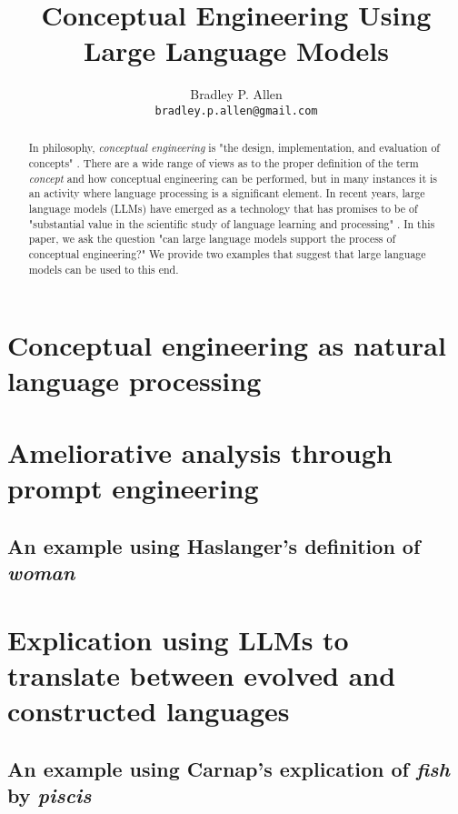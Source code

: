 \documentclass{article}
\title{Conceptual Engineering Using Large Language Models}
\author{Bradley P. Allen\\
\texttt{bradley.p.allen@gmail.com} \\
}
\begin{document}
\maketitle

\begin{abstract}
In philosophy, \textit{conceptual engineering} is "the design, implementation, and evaluation of concepts" \cite{chalmers2020conceptual}. There are a wide range of views as to the proper definition of the term \textit{concept} and how conceptual engineering can be performed, but in many instances it is an activity where language processing is a significant element. In recent years, large language models (LLMs) have emerged as a technology that has promises to be of "substantial value in the scientific study of language learning and processing" \cite{mahowald2023dissociating}.  In this paper, we ask the question "can large language models support the process of conceptual engineering?" We provide two examples that suggest that large language models can be used to this end. 
\end{abstract}


\section{Conceptual engineering as natural language processing}

\section{Ameliorative analysis through prompt engineering}

\subsection{An example using Haslanger's definition of \textit{woman}}

\section{Explication using LLMs to translate between evolved and constructed languages}

\subsection{An example using Carnap's explication of \textit{fish} by \textit{piscis}}
\end{document}

